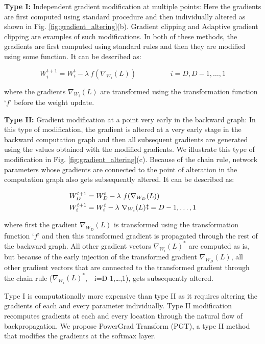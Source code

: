 \documentclass[runningheads]{llncs}
\begin{document}
\textbf{Type I:} Independent gradient modification at multiple points: Here the
gradients are first computed using standard procedure and then individually altered as
shown in Fig. \ref{fig:gradient_altering}(b). Gradient clipping
\cite{pascanu2013difficulty} and Adaptive gradient clipping \cite{brock2021high} are
examples of such modifications. In both of these methods, the gradients are first
computed using standard rules and then they are modified using some function. It can be
described as:

\begin{equation}
W_i^{t+1} = W_i^t - \lambda\ f(\nabla_{W_i}(L))
\hspace{2cm}
i=D,D-1,\ldots,1
\end{equation}

where the gradients $\nabla_{W_i}(L)$ are transformed using the transformation function
`$f$' before the weight update.

\textbf{Type II:} Gradient modification at a point very early in the backward graph: In
this type of modification, the gradient is altered at a very early stage in the backward
computation graph and then all subsequent gradients are generated using the values
obtained with the modified gradients. We illustrate this type of modification in Fig.
\ref{fig:gradient_altering}(c). Because of the chain rule, network parameters whose
gradients are connected to the point of alteration in the computation graph also gets
subsequently altered. It can be described as:

\begin{align}
W_D^{t+1} &= W_D^t - \lambda\ f(\nabla_{W_D}(L)) & \\
W_i^{t+1} &= W_i^t - \lambda\ \nabla_{W_i}(L)^{*} &\hspace{-1cm} i=D-1,\ldots,1
\end{align}

where first the gradient $\nabla_{W_D}(L)$ is transformed using the transformation
function `$f$' and then this transformed gradient is propagated through the rest of the
backward graph. All other gradient vectors $\nabla_{W_i}(L)^{*}$ are computed as is, but
because of the early injection of the transformed gradient $\nabla_{W_D}(L)$, all other
gradient vectors that are connected to the transformed gradient through the chain rule
($\nabla_{W_i}(L)^{*}$,\ \ i=D-1,\ldots,1), gets subsequently altered.

Type I is computationally more expensive than type II as it requires altering the
gradients of each and every parameter individually. Type II modification recomputes
gradients at each and every location through the natural flow of backpropagation. We
propose PowerGrad Transform (PGT), a type II method that modifies the gradients at the
softmax layer.
\end{document}
